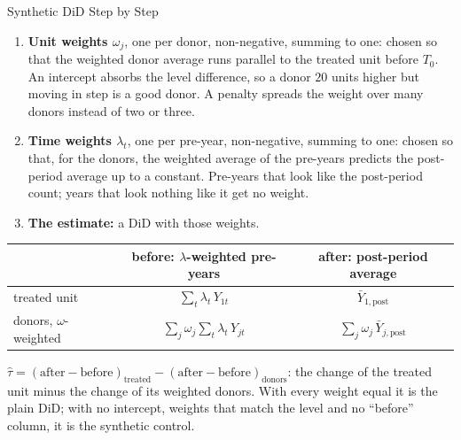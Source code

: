 \documentclass[main.tex]{subfiles}
\begin{document}
\begin{frame}{Synthetic DiD Step by Step}
  \small
  \begin{enumerate}\small
    \item \textbf{Unit weights $\omega_j$}, one per donor, non-negative,
      summing to one: chosen so that the weighted donor average runs parallel
      to the treated unit before $T_0$. An intercept absorbs the level
      difference, so a donor $20$ units higher but moving in step is a good
      donor. A penalty spreads the weight over many donors instead of two or
      three.
    \item \textbf{Time weights $\lambda_t$}, one per pre-year, non-negative,
      summing to one: chosen so that, for the donors, the weighted average of
      the pre-years predicts the post-period average up to a constant.
      Pre-years that look
      like the post-period count; years that look nothing like it get no
      weight.
    \item \textbf{The estimate:} a DiD with those weights.
  \end{enumerate}
  \smallskip
  \begin{center}
    \footnotesize
    \begin{tabular}{@{}lcc@{}}
      \toprule
      & before: $\lambda$-weighted pre-years & after: post-period average \\
      \midrule
      treated unit & $\sum_t \lambda_t\, Y_{1t}$ & $\bar Y_{1,\text{post}}$ \\
      donors, $\omega$-weighted & $\sum_j \omega_j \sum_t \lambda_t\, Y_{jt}$
        & $\sum_j \omega_j\, \bar Y_{j,\text{post}}$ \\
      \bottomrule
    \end{tabular}
  \end{center}
  \smallskip
  $\hat\tau = (\text{after} - \text{before})_{\text{treated}} -
  (\text{after} - \text{before})_{\text{donors}}$: the change of the treated
  unit minus the change of its weighted donors. With every weight equal it is
  the plain DiD; with no intercept, weights that match the level and no
  ``before'' column, it is the synthetic control.
\end{frame}
\end{document}
